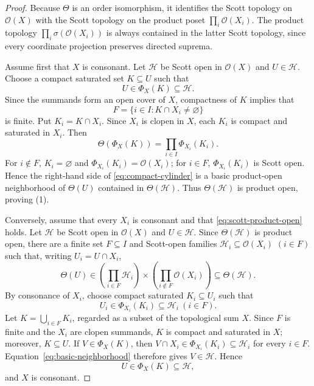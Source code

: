 \documentclass[10pt,a4paper]{amsart}
\newcommand{\OO}{\mathcal O}
\begin{document}
\begin{proof}
Because $\Theta$ is an order isomorphism, it identifies the Scott topology on
$\OO(X)$ with the Scott topology on the product poset
$\prod_i\OO(X_i)$.  The product topology
$\prod_i\sigma(\OO(X_i))$ is always contained in the latter Scott topology,
since every coordinate projection preserves directed suprema.

Assume first that $X$ is consonant.  Let $\mathcal H$ be Scott open in
$\OO(X)$ and $U\in\mathcal H$.  Choose a compact saturated set $K\subseteq U$
such that
\[
  U\in\Phi_X(K)\subseteq\mathcal H.
\]
Since the summands form an open cover of $X$, compactness of $K$ implies
that
\[
  F=\{i\in I:K\cap X_i\ne\varnothing\}
\]
is finite.  Put $K_i=K\cap X_i$.  Since $X_i$ is clopen in $X$, each $K_i$
is compact and saturated in $X_i$.  Then
\begin{equation}\label{eq:compact-cylinder}
  \Theta(\Phi_X(K))
  =\prod_{i\in I}\Phi_{X_i}(K_i).
\end{equation}
For $i\notin F$, $K_i=\varnothing$ and
$\Phi_{X_i}(K_i)=\OO(X_i)$; for $i\in F$, $\Phi_{X_i}(K_i)$ is Scott
open.  Hence the right-hand side of
\eqref{eq:compact-cylinder} is a basic product-open neighborhood of
$\Theta(U)$ contained in $\Theta(\mathcal H)$.  Thus $\Theta(\mathcal H)$ is
product open, proving (1).

Conversely, assume that every $X_i$ is consonant and that
\eqref{eq:scott-product-open} holds.  Let $\mathcal H$ be Scott open in
$\OO(X)$ and $U\in\mathcal H$.  Since $\Theta(\mathcal H)$ is product open,
there are a finite set $F\subseteq I$ and Scott-open families
$\mathcal H_i\subseteq\OO(X_i)$ $(i\in F)$ such that, writing
$U_i=U\cap X_i$,
\begin{equation}\label{eq:basic-neighborhood}
  \Theta(U)\in
  \left(\prod_{i\in F}\mathcal H_i\right)
  \times\left(\prod_{i\notin F}\OO(X_i)\right)
  \subseteq \Theta(\mathcal H).
\end{equation}
By consonance of $X_i$, choose compact saturated $K_i\subseteq U_i$ such
that
\[
  U_i\in\Phi_{X_i}(K_i)\subseteq\mathcal H_i
  ~ (i\in F).
\]
Let $K=\bigcup_{i\in F}K_i$, regarded as a subset of the topological sum
$X$.  Since $F$ is finite and the $X_i$ are clopen summands, $K$ is compact
and saturated in $X$; moreover, $K\subseteq U$.  If
$V\in\Phi_X(K)$, then $V\cap X_i\in\Phi_{X_i}(K_i)\subseteq\mathcal H_i$
for every $i\in F$.  Equation~\eqref{eq:basic-neighborhood} therefore gives
$V\in\mathcal H$.  Hence
\[
  U\in\Phi_X(K)\subseteq\mathcal H,
\]
and $X$ is consonant.
\end{proof}
\end{document}
